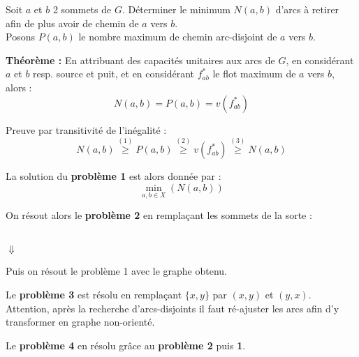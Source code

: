 \documentclass[a4paper, 8pt]{article}
\begin{document}
\begin{multicols*}{3}
\underline{} Soit $a$ et $b$ 2 sommets de $G$. Déterminer le minimum $N(a,b)$ d'arcs à retirer afin de plus avoir de chemin de $a$ vers $b$.\\
Posons $P(a,b)$ le nombre maximum de chemin arc-disjoint de $a$ vers $b$.

\smallskip
\textbf{Théorème :} En attribuant des capacités unitaires aux arcs de $G$, en considérant $a$ et $b$ resp. source et puit, et en considérant $f^*_{ab}$ le flot maximum de $a$ vers $b$, alors :
\[ N(a,b) = P(a,b) = v(f^*_{ab}) \]

Preuve par transitivité de l'inégalité :
\[ N(a,b) \overset{(1)}{\geqslant} P(a,b) \overset{(2)}{\geqslant} v(f^*_{ab}) \overset{(3)}{\geqslant} N(a,b)\]

La solution du \textbf{problème 1} est alors donnée par :
\[ \displaystyle \min_{a,b\in X}\left(N(a,b)\right) \]

On résout alors le \textbf{problème 2} en remplaçant les sommets de la sorte :
\begin{center}
\\
$\Downarrow$
\end{center}
\begin{center}
\end{center}
Puis on résout le problème 1 avec le graphe obtenu.

Le \textbf{problème 3} est résolu en remplaçant $\{x,y\}$ par $(x,y)$ et $(y,x)$. Attention, après la recherche d'arcs-disjoints il faut ré-ajuster les arcs afin d'y transformer en graphe non-orienté.

Le \textbf{problème 4} en résolu grâce au \textbf{problème 2} puis \textbf{1}.



\end{multicols*}
\end{document}
